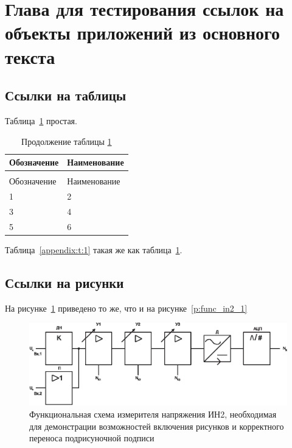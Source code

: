 \section{Глава для тестирования ссылок на объекты приложений из основного текста}

\subsection{Ссылки на таблицы}

Таблица~\ref{t_main:1} простая.

\begin{longtable}{|p{60mm}|p{100mm}|}
  \caption{Простая} \label{t_main:1} \\
  \hline
  \multicolumn{1}{|p{60mm}|}{\centering Обозначение} &
  \multicolumn{1}{p{100mm}|}{\centering Наименование} \\\hline
  \endfirsthead
  \caption*{Продолжение таблицы \ref{t_main:1}} \\
 \hline
  \multicolumn{1}{|p{60mm}|}{\centering Обозначение} &
  \multicolumn{1}{p{100mm}|}{\centering Наименование} \\\hline
  \endhead
   1    &   2   \\ \hline
   3    &   4   \\ \hline
   5    &   6   \\ \hline
\end{longtable}

Таблица~\ref{appendix:t:1} такая же как таблица~\ref{t_main:1}.




\subsection{Ссылки на рисунки}

На рисунке~\ref{p:func_in2_1_main} приведено то же, что и на рисунке~\ref{p:func_in2_1}

\begin{figure}[!h]
  \includegraphics[width=1\textwidth]{./about/func_in}
  \caption{Функциональная схема измерителя напряжения ИН2, необходимая для демонстрации возможностей включения рисунков и корректного переноса подрисуночной подписи}
  \label{p:func_in2_1_main}
\end{figure}



